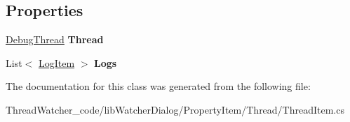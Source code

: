 \subsection*{Properties}
\begin{DoxyCompactItemize}
\item 
\hypertarget{classlib_watcher_dialog_1_1_property_item_1_1_thread_1_1_thread_item_a4c3b8cacd0a63110b6d9996f7814d863}{\hyperlink{classlib_wather_debugger_1_1_thread_1_1_debug_thread}{Debug\+Thread} {\bfseries Thread}}\label{classlib_watcher_dialog_1_1_property_item_1_1_thread_1_1_thread_item_a4c3b8cacd0a63110b6d9996f7814d863}

\item 
\hypertarget{classlib_watcher_dialog_1_1_property_item_1_1_thread_1_1_thread_item_acddeb98caae53983e5bdb298d5d865ad}{List$<$ \hyperlink{classlib_watcher_dialog_1_1_property_item_1_1_logger_1_1_log_item}{Log\+Item} $>$ {\bfseries Logs}}\label{classlib_watcher_dialog_1_1_property_item_1_1_thread_1_1_thread_item_acddeb98caae53983e5bdb298d5d865ad}

\end{DoxyCompactItemize}


The documentation for this class was generated from the following file\+:\begin{DoxyCompactItemize}
\item 
Thread\+Watcher\+\_\+code/lib\+Watcher\+Dialog/\+Property\+Item/\+Thread/Thread\+Item.\+cs\end{DoxyCompactItemize}
